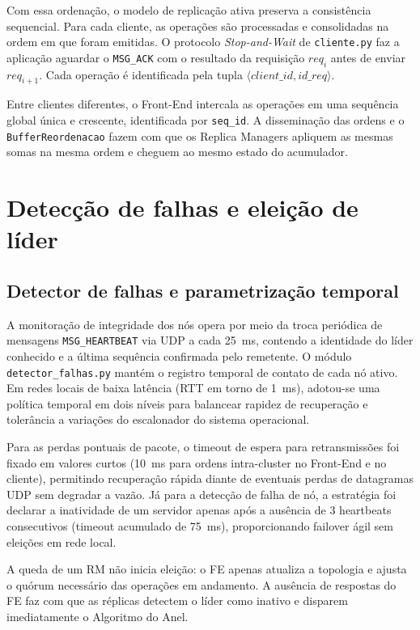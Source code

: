 \documentclass[12pt,a4paper]{article}
\newcommand{\arquivo}[1]{\texttt{#1}}
\newcommand{\mensagem}[1]{\texttt{#1}}
\begin{document}
Com essa ordenação, o modelo de replicação ativa preserva a consistência sequencial. Para cada cliente, as operações são processadas e consolidadas na ordem em que foram emitidas. O protocolo \textit{Stop-and-Wait} de \arquivo{cliente.py} faz a aplicação aguardar o \mensagem{MSG\_ACK} com o resultado da requisição $req_i$ antes de enviar $req_{i+1}$. Cada operação é identificada pela tupla $\langle client\_id, id\_req \rangle$.

Entre clientes diferentes, o Front-End intercala as operações em uma sequência global única e crescente, identificada por \arquivo{seq\_id}. A disseminação das ordens e o \arquivo{BufferReordenacao} fazem com que os Replica Managers apliquem as mesmas somas na mesma ordem e cheguem ao mesmo estado do acumulador.

\section{Detecção de falhas e eleição de líder}

\subsection{Detector de falhas e parametrização temporal}

A monitoração de integridade dos nós opera por meio da troca periódica de mensagens \mensagem{MSG\_HEARTBEAT} via UDP a cada 25~ms, contendo a identidade do líder conhecido e a última sequência confirmada pelo remetente. O módulo \arquivo{detector\_falhas.py} mantém o registro temporal de contato de cada nó ativo. Em redes locais de baixa latência (RTT em torno de 1~ms), adotou-se uma política temporal em dois níveis para balancear rapidez de recuperação e tolerância a variações do escalonador do sistema operacional.

Para as perdas pontuais de pacote, o timeout de espera para retransmissões foi fixado em valores curtos (10~ms para ordens intra-cluster no Front-End e no cliente), permitindo recuperação rápida diante de eventuais perdas de datagramas UDP sem degradar a vazão.
Já para a detecção de falha de nó, a estratégia foi declarar a inatividade de um servidor apenas após a ausência de 3 heartbeats consecutivos (timeout acumulado de 75~ms), proporcionando failover ágil sem eleições em rede local.


A queda de um RM não inicia eleição: o FE apenas atualiza a topologia e ajusta o quórum necessário das operações em andamento. A ausência de respostas do FE faz com que as réplicas detectem o líder como inativo e disparem imediatamente o Algoritmo do Anel.
\end{document}
